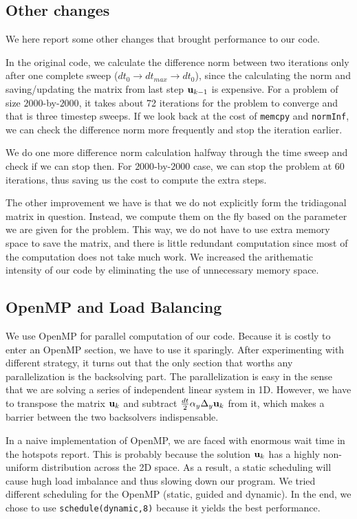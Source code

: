 \documentclass[a4paper,11pt]{article}
\begin{document}
\begin{multicols}{2}
	\subsection{Other changes}
	We here report some other changes that brought performance to our code.
	\par In the original code, we calculate the difference norm between two iterations only after one complete sweep ($dt_0\rightarrow dt_{max} \rightarrow dt_0$), since the calculating the norm and saving/updating the matrix from last step ${\bf u}_{k-1}$ is expensive. For a problem of size $2000$-by-$2000$, it takes about 72 iterations for the problem to converge and that is three timestep sweeps. If we look back at the cost of \verb|memcpy| and \verb|normInf|, we can check the difference norm more frequently and stop the iteration earlier.
	\par We do one more difference norm calculation halfway through the time sweep and check if we can stop then. For $2000$-by-$2000$ case, we can stop the problem at 60 iterations, thus saving us the cost to compute the extra steps.
	\par The other improvement we have is that we do not explicitly form the tridiagonal matrix in question. Instead, we compute them on the fly based on the parameter we are given for the problem. This way, we do not have to use extra memory space to save the matrix, and there is little redundant computation since most of the computation does not take much work. We increased the arithematic intensity of our code by eliminating the use of unnecessary memory space. 
	\subsection{OpenMP and Load Balancing}
    We use OpenMP for parallel computation of our code. Because it is costly to enter an OpenMP section, we have to use it sparingly. After experimenting with different strategy, it turns out that the only section that worths any parallelization is the backsolving part. The parallelization is easy in the sense that we are solving a series of independent linear system in 1D. However, we have to transpose the matrix ${\bf u}_k$ and subtract $\frac{dt}{2}\alpha_y\Delta_y {\bf u}_k$ from it, which makes a barrier between the two backsolvers indispensable.
    \par In a naive implementation of OpenMP, we are faced with enormous wait time in the hotspots report. This is probably because the solution ${\bf u}_k$ has a highly non-uniform distribution across the 2D space. As a result, a static scheduling will cause hugh load imbalance and thus slowing down our program. We tried different scheduling for the OpenMP (static, guided and dynamic). In the end, we chose to use \verb|schedule(dynamic,8)| because it yields the best performance.

\end{multicols}
\end{document}
